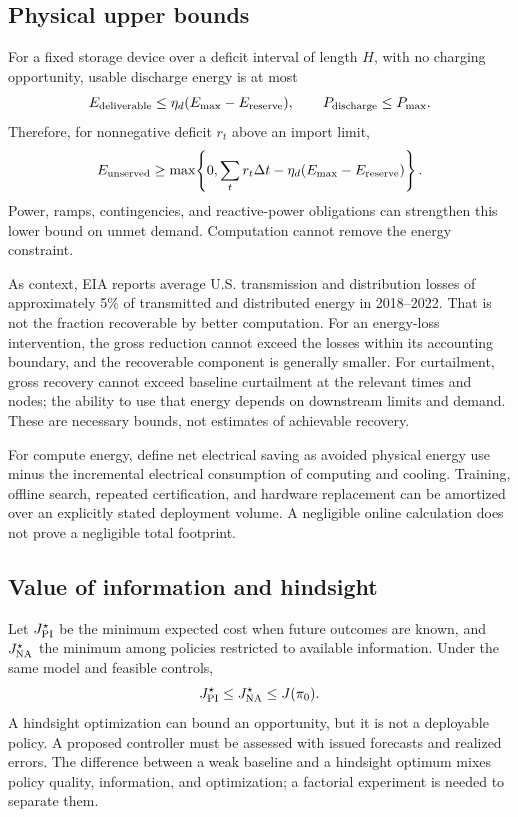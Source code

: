 \documentclass[11pt,letterpaper]{article}
\begin{document}
\subsection{Physical upper bounds}
For a fixed storage device over a deficit interval of length $H$, with no charging opportunity, usable discharge energy is at most
\[
 E_{\rm deliverable}\le \eta_d(E_{\max}-E_{\rm reserve}),
 \qquad P_{\rm discharge}\le P_{\max}.
\]
Therefore, for nonnegative deficit $r_t$ above an import limit,
\begin{equation}
 E_{\rm unserved}\ge
 \max\!\left\{0,\sum_t r_t\Delta t-
       \eta_d(E_{\max}-E_{\rm reserve})\right\}.
 \label{eq:storagebound}
\end{equation}
Power, ramps, contingencies, and reactive-power obligations can strengthen this lower bound on unmet demand. Computation cannot remove the energy constraint.

As context, EIA reports average U.S. transmission and distribution losses of approximately 5\% of transmitted and distributed energy in 2018--2022.\cite{eia} That is not the fraction recoverable by better computation. For an energy-loss intervention, the gross reduction cannot exceed the losses within its accounting boundary, and the recoverable component is generally smaller. For curtailment, gross recovery cannot exceed baseline curtailment at the relevant times and nodes; the ability to use that energy depends on downstream limits and demand. These are necessary bounds, not estimates of achievable recovery.

For compute energy, define net electrical saving as avoided physical energy use minus the incremental electrical consumption of computing and cooling. Training, offline search, repeated certification, and hardware replacement can be amortized over an explicitly stated deployment volume. A negligible online calculation does not prove a negligible total footprint.

\subsection{Value of information and hindsight}
Let $J^\star_{\rm PI}$ be the minimum expected cost when future outcomes are known, and $J^\star_{\rm NA}$ the minimum among policies restricted to available information. Under the same model and feasible controls,
\[
 J^\star_{\rm PI}\le J^\star_{\rm NA}\le J(\pi_0).
\]
A hindsight optimization can bound an opportunity, but it is not a deployable policy. A proposed controller must be assessed with issued forecasts and realized errors. The difference between a weak baseline and a hindsight optimum mixes policy quality, information, and optimization; a factorial experiment is needed to separate them.
\end{document}
